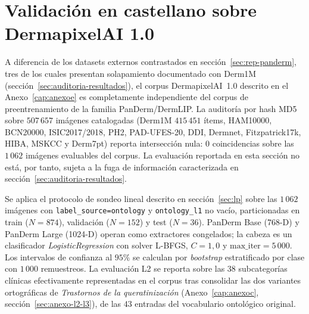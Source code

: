 \section{Validación en castellano sobre DermapixelAI 1.0}
\label{sec:dermapixel-results}

A diferencia de los datasets externos contrastados en
secci\'on~\ref{sec:rep-panderm}, tres de los cuales presentan
solapamiento documentado con Derm1M
(secci\'on~\ref{sec:auditoria-resultados}), el corpus DermapixelAI~1.0
descrito en el Anexo~\ref{cap:anexoe} es completamente independiente
del corpus de preentrenamiento de la familia PanDerm/DermLIP. La
auditoría por hash MD5 sobre $507\,657$ imágenes catalogadas
(Derm1M $415\,451$ ítems, HAM10000, BCN20000, ISIC2017/2018,
PH2, PAD-UFES-20, DDI, Dermnet, Fitzpatrick17k, HIBA, MSKCC y
Derm7pt) reporta intersección nula: $0$ coincidencias sobre las
$1\,062$ imágenes evaluables del corpus. La evaluación reportada en
esta sección no está, por tanto, sujeta a la fuga de información
caracterizada en secci\'on~\ref{sec:auditoria-resultados}.

Se aplica el protocolo de sondeo lineal descrito en
secci\'on~\ref{sec:lp} sobre las $1\,062$ imágenes con
\texttt{label\_source=ontology} y \texttt{ontology\_l1} no vacío,
particionadas en train ($N = 874$), validación ($N = 152$) y test
($N = 36$). PanDerm Base (768-D) y PanDerm Large (1024-D) operan
como extractores congelados; la cabeza es un clasificador
\emph{LogisticRegression} con solver L-BFGS, $C = 1{,}0$ y
$\mathrm{max\_iter} = 5\,000$. Los intervalos de confianza al
$95\%$ se calculan por \emph{bootstrap} estratificado por clase
con $1\,000$ remuestreos. La evaluación L2 se reporta sobre las
$38$ subcategorías clínicas efectivamente representadas en el
corpus tras consolidar las dos variantes ortográficas de
\emph{Trastornos de la queratinización} (Anexo~\ref{cap:anexoc},
secci\'on~\ref{sec:anexo-l2-l3}), de las $43$ entradas del
vocabulario ontológico original.

